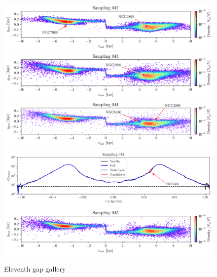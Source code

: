 \documentclass{aa}
\begin{document}
\begin{appendix}
    \begin{figure}
      \centering
      \includegraphics[width=\linewidth]{gallery_of_gaps_monte-carlo-042.png}
      \includegraphics[width=\linewidth]{gallery_of_gaps_monte-carlo-043.png}
      \includegraphics[width=\linewidth]{gallery_of_gaps_monte-carlo-044.png}
      \includegraphics[width=\linewidth]{tau-profile-monte-carlo-044.png}
      \includegraphics[width=\linewidth]{gallery_of_gaps_monte-carlo-045.png}
      \caption{Eleventh gap gallery}
      \label{fig:gallery010}
    \end{figure}   


\end{appendix}
\end{document}
